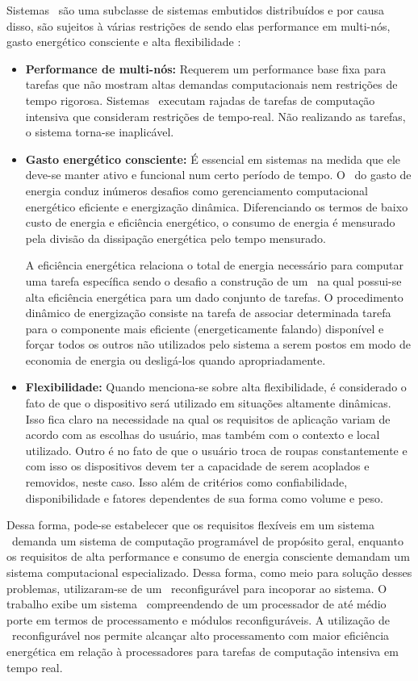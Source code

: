 		Sistemas \wearables\ são uma subclasse de sistemas embutidos distribuídos e por causa disso, são sujeitos à várias restrições de \design sendo elas performance em multi-nós, gasto energético consciente e alta flexibilidade \cite{Plessl2003}:
        \begin{itemize}
        	\item \textbf{Performance de multi-nós:} Requerem um performance base fixa para tarefas que não mostram altas demandas computacionais nem restrições de tempo rigorosa.
            Sistemas \wearables\ executam rajadas de tarefas de computação intensiva que consideram restrições de tempo-real. Não realizando as tarefas, o sistema torna-se inaplicável.

			\item \textbf{Gasto energético consciente:} É essencial em sistemas na medida que ele deve-se manter ativo e funcional num certo período de tempo. O \design\ do gasto de energia conduz inúmeros desafios como gerenciamento computacional energético eficiente e energização dinâmica. Diferenciando os termos de baixo custo de energia e eficiência energético, o consumo de energia é mensurado pela divisão da dissipação energética pelo tempo mensurado.

            A eficiência energética relaciona o total de energia necessário para computar uma tarefa específica sendo o desafio a construção de um \design\ na qual possui-se alta eficiência energética para um dado conjunto de tarefas. O procedimento dinâmico de energização consiste na tarefa de associar determinada tarefa para o componente mais eficiente (energeticamente falando) disponível e forçar todos os outros não utilizados pelo sistema a serem postos em modo de economia de energia ou desligá-los quando apropriadamente.

			\item \textbf{Flexibilidade:} Quando menciona-se sobre alta flexibilidade, é considerado o fato de que o dispositivo será utilizado em situações altamente dinâmicas. Isso fica claro na necessidade na qual os requisitos de aplicação variam de acordo com as escolhas do usuário, mas também com o contexto e local utilizado. Outro é no fato de que o usuário troca de roupas constantemente e com isso os dispositivos devem ter a capacidade de serem acoplados e removidos, neste caso. Isso além de critérios como confiabilidade, disponibilidade e fatores dependentes de sua forma como volume e peso.
        \end{itemize}

		Dessa forma, pode-se estabelecer que os requisitos flexíveis em um sistema \wearable\ demanda um sistema de computação programável de propósito geral, enquanto os requisitos de alta performance e consumo de energia consciente demandam um sistema computacional especializado. Dessa forma, como meio para solução desses problemas, \cite{Plessl2003} utilizaram-se de um \hardware\ reconfigurável para incoporar ao sistema. O trabalho exibe um sistema \wearables\ compreendendo de um processador de até médio porte em termos de processamento e módulos reconfiguráveis.
		A utilização de \hardware\ reconfigurável nos permite alcançar alto processamento com maior eficiência energética em relação à processadores para tarefas de computação intensiva em tempo real.
